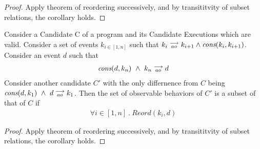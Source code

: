 \begin{proof}
    Apply theorem of reordering successively, and by transititvity of subset relations, the corollary holds.
\end{proof}

\begin{corollary}
    Consider a Candidate C of a program and its Candidate Executions which are valid. Consider a set of events $k_{i \in[1,n]}$ such that $k_i\stackrel{\longrightarrow}{_{ao}}k_{i+1} \wedge \textit{cons}(k_i,k_{i+1})$.
    Consider an event $d$ such that 
    \begin{align*}
        \textit{cons}(d,k_n) \ \wedge \ k_n\stackrel{\longrightarrow}{_{ao}}d  
    \end{align*}
    Consider another candidate $C'$ with the only differnence from $C$ being $\cons{d}{k_1} \ \wedge \ \reln{d}{ao}{k_1}$.
    Then the set of observable behaviors of $C'$ is a subset of that of $C$ if 
    \begin{align}
        \forall i \in [1,n] \ . \ Reord(k_i,d)
    \end{align} 
\end{corollary}

\begin{proof}
    Apply theorem of reordering successively, and by transititvity of subset relations, the corollary holds.
\end{proof}
